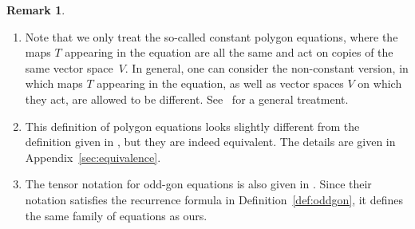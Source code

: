 \documentclass[10pt,a4paper]{amsart}
\numberwithin{equation}{section}
\theoremstyle{definition}
\newtheorem{Remark}[Theorem]{Remark}
\begin{document}
\begin{Remark}\label{rem:translation}\quad
\begin{enumerate}\itemsep=0pt
 \item Note that we only treat the so-called constant polygon equations, where the maps $T$ appearing in the equation are all the same and act on copies of the same vector space~$V$.
 In general, one can consider the non-constant version, in which maps $T$ appearing in the equation, as well as vector spaces $V$ on which they act, are allowed to be different. See~\cite{dimakis2015simplex} for a general treatment.
 \item This definition of polygon equations looks slightly different from the definition given in \cite[Section~4.2]{dimakis2015simplex}, but they are indeed equivalent. The details are given in Appendix~\ref{sec:equivalence}.
 \item The tensor notation for odd-gon equations is also given in \cite[Proposition~3]{dimakis2021grassmannian}. Since their notation satisfies the recurrence formula in Definition~\ref{def:oddgon}, it defines the same family of equations as ours.
\end{enumerate}
\end{Remark}
\end{document}
